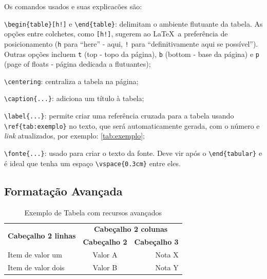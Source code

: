 Os comandos usados e suas explicacões são:
\begin{alineas}
	\item \texttt{\textbackslash begin\{table\}[h!]} e \texttt{\textbackslash end\{table\}}: delimitam o ambiente flutuante da tabela. As opções entre colchetes, como \texttt{[h!]}, sugerem ao \LaTeX\  a preferência de posicionamento (\texttt{h} para ``here'' - aqui, \texttt{!} para ``definitivamente aqui se possível''). Outras opções incluem \texttt{t} (top - topo da página), \texttt{b} (bottom - base da página) e \texttt{p} (page of floats - página dedicada a flutuantes);
	\item \texttt{\textbackslash centering}: centraliza a tabela na página;
	\item \texttt{\textbackslash caption\{...\}}: adiciona um título à tabela;
	\item \texttt{\textbackslash label\{...\}}: permite criar uma referência cruzada para a tabela usando\\ \texttt{\textbackslash ref\{tab:exemplo\}} no texto, que será automaticamente gerada, com o número e \emph{link} atualizados, por exemplo: \autoref{tab:exemplo};
	\item \texttt{\textbackslash fonte\{...\}}: usado para criar o texto da fonte. Deve vir após o \texttt{\textbackslash end\{tabular\}} e é ideal que tenha um espaço \texttt{\textbackslash vspace\{0.3cm\}} entre eles.
\end{alineas}

\subsection{Formatação Avançada}

\begin{table}[h!]
	\centering
	\caption{Exemplo de Tabela com recursos avançados}\label{tab:exemploAvan}
	\renewcommand{\arraystretch}{2.0} %
	\setlength{\tabcolsep}{2ex} %
	\begin{tabular}{m{2.5cm} c r}
		\hline
		\multirow{2}{2.5cm}{\bf Cabeçalho 2 linhas} & \multicolumn{2}{|c}{\bf Cabeçalho 2 colunas}\\
		\cline{2-3}
		& \multicolumn{1}{|c|}{\bf Cabeçalho 2} & \bf Cabeçalho 3 \\
		\hline
		Item de valor um & Valor A & Nota X \\
		Item de valor dois & Valor B & Nota Y \\
		\hline
	\end{tabular}
	
	\vspace{.3cm}
\end{table}

